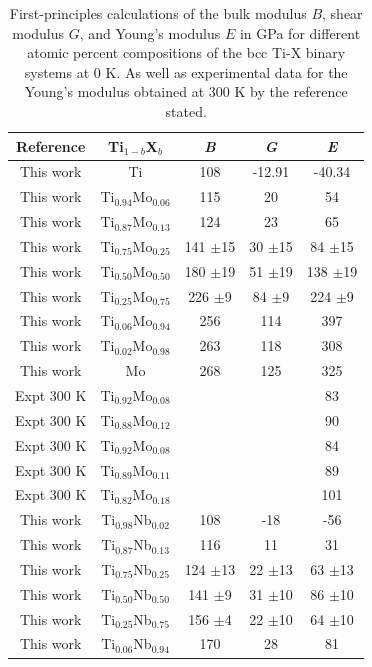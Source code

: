 \newpage
\begin{longtable}[H]{ c c c c c}
	\caption{First-principles calculations of the bulk modulus $B$, shear modulus $G$, and Young's modulus $E$ in GPa for different atomic percent compositions of the bcc Ti-X binary systems at 0 K. As well as experimental data for the Young's modulus obtained at 300 K by the reference stated.} 	\label{Ch5-table:tixelasmod} \\
	\hline
	Reference & Ti$_{1-b}$X$_b$ & \textit{B} & \textit{G} & \textit{E}\\
	\hline
	\endhead
	\hline
	\endfoot
	This work & Ti & 108 & -12.91 & -40.34\\
	This work & Ti$_{0.94}$Mo$_{0.06}$ & 115 & 20 & 54\\
	This work & Ti$_{0.87}$Mo$_{0.13}$ & 124 & 23 & 65\\
	This work & Ti$_{0.75}$Mo$_{0.25}$ & 141 $\pm$15 & 30 $\pm$15 & 84 $\pm$15\\
	This work & Ti$_{0.50}$Mo$_{0.50}$ & 180 $\pm$19 & 51 $\pm$19 & 138 $\pm$19\\
	This work & Ti$_{0.25}$Mo$_{0.75}$ & 226 $\pm$9 & 84 $\pm$9 & 224 $\pm$9\\
	This work & Ti$_{0.06}$Mo$_{0.94}$ & 256 & 114 & 397\\
	This work & Ti$_{0.02}$Mo$_{0.98}$ & 263 & 118 & 308\\
	This work & Mo & 268 & 125 & 325\\
	Expt 300 K \cite{Zhang2015} & Ti$_{0.92}$Mo$_{0.08}$ & & & 83\\
	Expt 300 K \cite{Zhang2015} & Ti$_{0.88}$Mo$_{0.12}$ & & & 90\\
	Expt 300 K \cite{Boyer1994} & Ti$_{0.92}$Mo$_{0.08}$ & & & 84\\
	Expt 300 K \cite{Boyer1994} & Ti$_{0.89}$Mo$_{0.11}$ & & & 89\\
	Expt 300 K \cite{Boyer1994} & Ti$_{0.82}$Mo$_{0.18}$ & & & 101\\
	This work & Ti$_{0.98}$Nb$_{0.02}$ & 108 & -18 & -56\\
	This work & Ti$_{0.87}$Nb$_{0.13}$ & 116 & 11 & 31\\
	This work & Ti$_{0.75}$Nb$_{0.25}$ & 124 $\pm$13 & 22 $\pm$13 & 63 $\pm$13\\
	This work & Ti$_{0.50}$Nb$_{0.50}$ & 141 $\pm$9 & 31 $\pm$10 & 86 $\pm$10\\
	This work & Ti$_{0.25}$Nb$_{0.75}$ & 156 $\pm$4 & 22 $\pm$10 & 64 $\pm$10\\
	This work & Ti$_{0.06}$Nb$_{0.94}$ & 170 & 28 & 81\\

\end{longtable}
